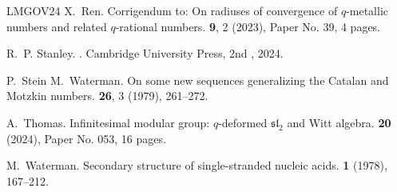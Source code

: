 \documentclass[11pt,reqno]{amsart}
\theoremstyle{plain}
\theoremstyle{definition}
\numberwithin{figure}{section}
\numberwithin{table}{section}
\numberwithin{equation}{section}
\begin{document}
\begin{thebibliography}{LMGOV24}
X.~\bgroup\sc Ren\egroup{}.
\newblock Corrigendum to: On radiuses of convergence of {$q$}-metallic numbers
  and related {$q$}-rational numbers.
 {\bf 9}, 2 (2023), Paper No. 39, 4 pages.

R.~P. \bgroup\sc Stanley\egroup{}.
.
\newblock Cambridge University Press, 2nd \editionname{}, 2024.

P.~\bgroup\sc Stein\egroup{} \andname{} M.~\bgroup\sc Waterman\egroup{}.
\newblock On some new sequences generalizing the Catalan and Motzkin numbers.
 {\bf 26}, 3 (1979), 261--272.

A.~\bgroup\sc Thomas\egroup{}.
\newblock Infinitesimal modular group: {$q$}-deformed {$\mathfrak{sl}_2$} and
  {W}itt algebra.
 {\bf 20}
  (2024), Paper No. 053, 16 pages.

M.~\bgroup\sc Waterman\egroup{}.
\newblock Secondary structure of single-stranded nucleic acids.
 {\bf 1} (1978), 167--212.

\end{thebibliography}
\end{document}
